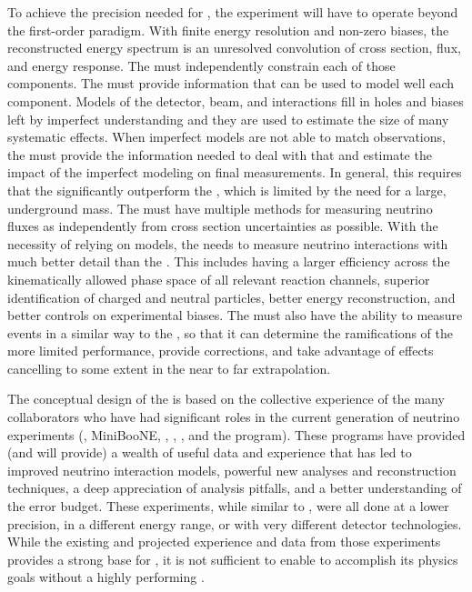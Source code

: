 To achieve the precision needed for , the experiment will have to operate beyond the first-order paradigm. With finite energy resolution and non-zero biases, the reconstructed energy spectrum is an unresolved convolution of cross section, flux, and energy response. The  must independently constrain each of those components.  The  must provide information that can be used to model well each component. Models of the detector, beam, and interactions fill in holes and biases left by imperfect understanding and they are used to estimate the size of many systematic effects.  When imperfect models are not able to match observations, the  must provide the information needed to deal with that and estimate the impact of the imperfect modeling on final measurements. In general, this requires that the  significantly outperform the , which is limited by the need for a large, underground mass. The  must have multiple methods for measuring neutrino fluxes as independently from cross section uncertainties as possible. With the necessity of relying on models, the  needs to measure neutrino interactions with much better detail than the . This includes having a larger efficiency across the kinematically allowed phase space of all relevant reaction channels, superior identification of charged and neutral particles, better energy reconstruction, and better controls on experimental biases. The  must also have the ability to measure events in a similar way to the , so that it can determine the ramifications of the more limited  performance, provide corrections, and take advantage of effects cancelling to some extent in the near to far extrapolation.

The conceptual design of the  is based on the collective experience of the many  collaborators who have had significant roles in the current generation of neutrino experiments (, MiniBooNE, , , , and the  program).  These programs have provided (and will provide) a wealth of useful data and experience that has led to improved neutrino interaction models, powerful new analyses and reconstruction techniques, a deep appreciation of analysis pitfalls, and a better understanding of the error budget. 
These experiments, while similar to , were all %
done at a lower precision, in a different energy range, or with very different detector technologies. While the existing and projected experience and data from those experiments provides a strong base for , it is not sufficient to enable  to accomplish its physics goals without a highly performing .  

